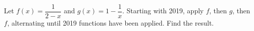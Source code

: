 Let $f(x)=\dfrac{1}{2-x}$ and $g(x)=1-\dfrac{1}{x}$. Starting with 2019, apply $f$, then $g$, then $f$, alternating until 2019 functions have been applied. Find the result.
